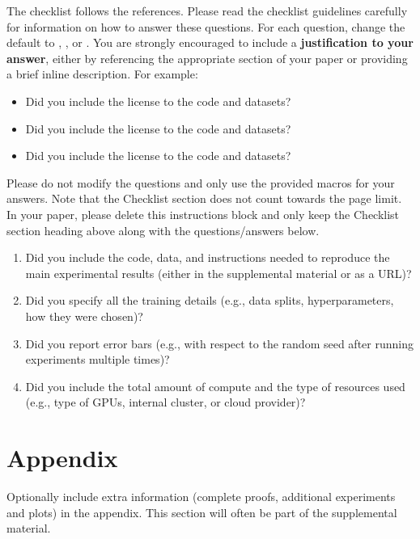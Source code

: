 \documentclass{article}
\begin{document}
The checklist follows the references.  Please
read the checklist guidelines carefully for information on how to answer these
questions.  For each question, change the default \answerTODO{} to \answerYes{},
\answerNo{}, or \answerNA{}.  You are strongly encouraged to include a {\bf
justification to your answer}, either by referencing the appropriate section of
your paper or providing a brief inline description.  For example:
\begin{itemize}
  \item Did you include the license to the code and datasets? 
  \item Did you include the license to the code and datasets? 
  \item Did you include the license to the code and datasets? \answerNA{}
\end{itemize}
Please do not modify the questions and only use the provided macros for your
answers.  Note that the Checklist section does not count towards the page
limit.  In your paper, please delete this instructions block and only keep the
Checklist section heading above along with the questions/answers below.




\begin{enumerate}
  \item Did you include the code, data, and instructions needed to reproduce the main experimental results (either in the supplemental material or as a URL)?
    \answerTODO{}
  \item Did you specify all the training details (e.g., data splits, hyperparameters, how they were chosen)?
    \answerTODO{}
        \item Did you report error bars (e.g., with respect to the random seed after running experiments multiple times)?
    \answerTODO{}
        \item Did you include the total amount of compute and the type of resources used (e.g., type of GPUs, internal cluster, or cloud provider)?
    \answerTODO{}

\end{enumerate}




\appendix


\section{Appendix}


Optionally include extra information (complete proofs, additional experiments and plots) in the appendix.
This section will often be part of the supplemental material.
\end{document}
